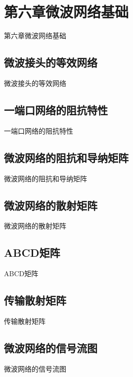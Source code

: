 \section{第六章\quad 微波网络基础}
\begin{frame}{第六章\quad 微波网络基础}

\end{frame}

\subsection{微波接头的等效网络}
\begin{frame}{微波接头的等效网络}

\end{frame}

\subsection{一端口网络的阻抗特性}
\begin{frame}{一端口网络的阻抗特性}

\end{frame}

\subsection{微波网络的阻抗和导纳矩阵}
\begin{frame}{微波网络的阻抗和导纳矩阵}

\end{frame}

\subsection{微波网络的散射矩阵}
\begin{frame}{微波网络的散射矩阵}

\end{frame}

\subsection{ABCD矩阵}
\begin{frame}{ABCD矩阵}

\end{frame}

\subsection{传输散射矩阵}
\begin{frame}{传输散射矩阵}

\end{frame}

\subsection{微波网络的信号流图}
\begin{frame}{微波网络的信号流图}

\end{frame}
